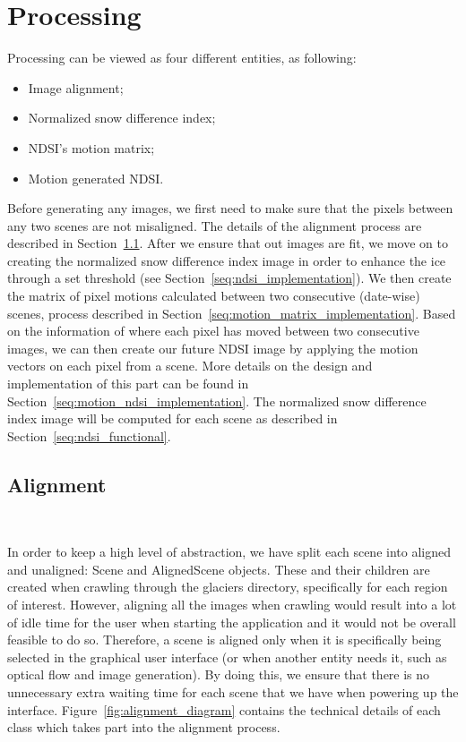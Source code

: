 \documentclass[12pt, a4paper]{report}
\begin{document}
	\section{Processing}
	\label{seq:processing}
	
	\par Processing can be viewed as four different entities, as following:
	
	\begin{itemize}
		\item Image alignment;
		\item Normalized snow difference index;
		\item NDSI's motion matrix;
		\item Motion generated NDSI.
	\end{itemize}

	\par Before generating any images, we first need to make sure that the pixels between any two scenes are not misaligned. The details of the alignment process are described in Section~\ref{seq:alignment_implementation}. After we ensure that out images are fit, we move on to creating the normalized snow difference index image in order to enhance the ice through a set threshold (see Section~\ref{seq:ndsi_implementation}). We then create the matrix of pixel motions calculated between two consecutive (date-wise) scenes, process described in Section~\ref{seq:motion_matrix_implementation}. Based on the information of where each pixel has moved between two consecutive images, we can then create our future NDSI image by applying the motion vectors on each pixel from a scene. More details on the design and implementation of this part can be found in Section~\ref{seq:motion_ndsi_implementation}.
	The normalized snow difference index image will be computed for each scene as described in Section~\ref{seq:ndsi_functional}.
	
	
	\subsection{Alignment}
	\label{seq:alignment_implementation}\
	
	\par In order to keep a high level of abstraction, we have split each scene into aligned and unaligned: Scene and AlignedScene objects. These and their children are created when crawling through the glaciers directory, specifically for each region of interest. However, aligning all the images when crawling would result into a lot of idle time for the user when starting the application and it would not be overall feasible to do so. Therefore, a scene is aligned only when it is specifically being selected in the graphical user interface (or when another entity needs it, such as optical flow and image generation). By doing this, we ensure that there is no unnecessary extra waiting time for each scene that we have when powering up the interface. Figure~\ref{fig:alignment_diagram} contains the technical details of each class which takes part into the alignment process.
	
\end{document}
